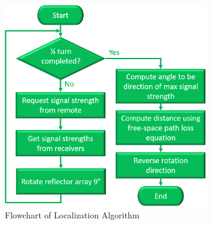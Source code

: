 \begin{figure}
    \centering
    \includegraphics[width=3.5in]{figs/img/localizationAlgoFlowchart.png}
    \caption{Flowchart of Localization Algorithm}
    \label{fig:localizationAlgoFlowchart}
\end{figure}

